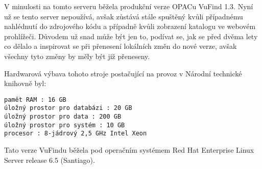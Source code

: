 \label{sec:vufind1}

V minulosti na tomto serveru běžela produkční verze OPACu VuFind 1.3. Nyní už se tento server nepoužívá, avšak zůstává stále spuštěný kvůli případnému nahlédnutí do zdrojového kódu a případně kvůli zobrazení katalogu ve webovém prohlížeči. Důvodem už snad může být jen to, podívat se, jak se před dvěma lety co dělalo a inspirovat se při přenesení lokálních změn do nové verze, avšak všechny tyto změny by měly být již přeneseny.

Hardwarová výbava tohoto stroje postačující na provoz v Národní technické knihovně byl:
\begin{verbatim}
pamět RAM : 16 GB
úložný prostor pro databázi : 20 GB
úložný prostor pro data : 200 GB
úložný prostor pro systém : 10 GB
procesor : 8-jádrový 2,5 GHz Intel Xeon
\end{verbatim}

Tato verze VuFindu běžela pod operačním systémem Red Hat Enterprise Linux Server release 6.5 (Santiago).




